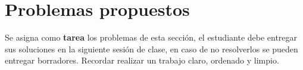 \section{Problemas propuestos}

Se asigna como \textbf{tarea} los problemas de esta sección, el estudiante debe entregar sus soluciones en la siguiente
sesión de clase, en caso de no resolverlos se pueden entregar borradores.
Recordar realizar un trabajo claro, ordenado y limpio.